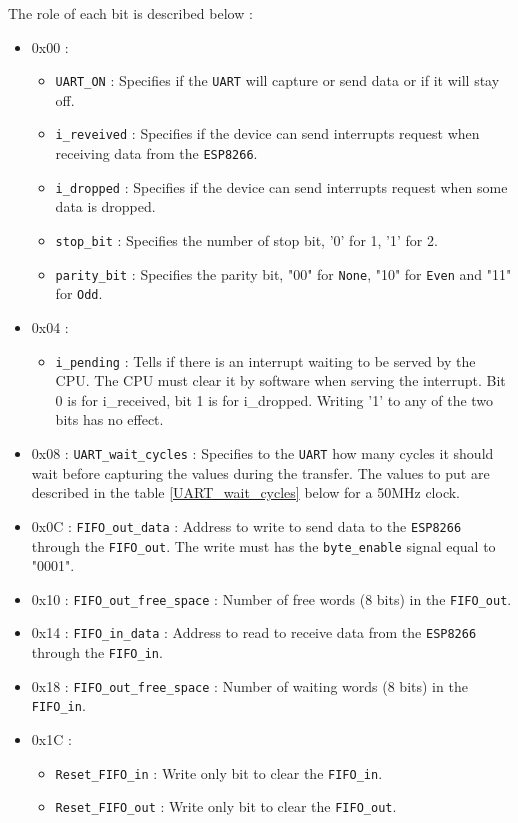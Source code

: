 \documentclass[11pt]{article}
\begin{document}
The role of each bit is described below :
\begin{itemize}
    \item 0x00 :
    \begin{itemize}
        \item \texttt{UART\_ON} : Specifies if the \texttt{UART} will capture or send data or if it will stay off.
        \item \texttt{i\_reveived} : Specifies if the device can send interrupts request when receiving data from the \texttt{ESP8266}.
        \item \texttt{i\_dropped} : Specifies if the device can send interrupts request when some data is dropped.
        \item \texttt{stop\_bit} : Specifies the number of stop bit, '0' for 1, '1' for 2.
        \item \texttt{parity\_bit} : Specifies the parity bit, "00" for \texttt{None}, "10" for \texttt{Even} and "11" for \texttt{Odd}.
    \end{itemize}
    \item 0x04 : 
    \begin{itemize}
        \item \texttt{i\_pending} : Tells if there is an interrupt waiting to be served by the CPU. The CPU must clear it by software when serving the interrupt. Bit 0 is for i\_received, bit 1 is for i\_dropped. Writing '1' to any of the two bits has no effect.
    \end{itemize}
    \item 0x08 : \texttt{UART\_wait\_cycles} : Specifies to the \texttt{UART} how many cycles it should wait before capturing the values during the transfer. The values to put are described in the table \ref{UART_wait_cycles} below for a 50MHz clock. 
    \item 0x0C : \texttt{FIFO\_out\_data} : Address to write to send data to the \texttt{ESP8266} through the \texttt{FIFO\_out}. The write must has the \texttt{byte\_enable} signal equal to "0001".
    \item 0x10 : \texttt{FIFO\_out\_free\_space} : Number of free words (8 bits) in the \texttt{FIFO\_out}. 
    \item 0x14 : \texttt{FIFO\_in\_data} : Address to read to receive data from the \texttt{ESP8266} through the \texttt{FIFO\_in}. 
    \item 0x18 : \texttt{FIFO\_out\_free\_space} : Number of waiting words (8 bits) in the \texttt{FIFO\_in}. 
    \item 0x1C :
    \begin{itemize}
        \item \texttt{Reset\_FIFO\_in} : Write only bit to clear the \texttt{FIFO\_in}.
        \item \texttt{Reset\_FIFO\_out} : Write only bit to clear the \texttt{FIFO\_out}.
    \end{itemize}
\end{itemize}
\end{document}

